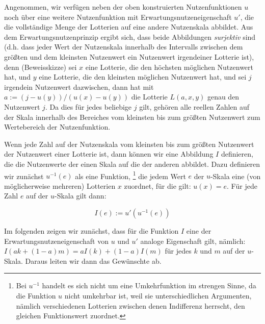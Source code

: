 Angenommen, wir verfügen neben der oben konstruierten Nutzenfunktionen $u$ noch
über eine weitere Nutzenfunktion mit Erwartungsnutzeneigenschaft $u'$, die die
vollständige Menge der Lotterien auf eine andere Nutzenskala abbildet. Aus dem
Erwartungsnutzenprinzip ergibt
sich, dass beide Abbildungen {\em surjektiv}
 sind (d.h. dass jeder Wert der
Nutzenskala innerhalb des Intervalls zwischen dem größten und dem kleinsten
Nutzenwert ein Nutzenwert irgendeiner Lotterie ist), denn (Beweisskizze) sei $x$
eine Lotterie, die den höchsten möglichen Nutzenwert hat, und $y$ eine Lotterie,
die den kleinsten möglichen Nutzenwert hat, und sei $j$ irgendein Nutzenwert
dazwischen, dann hat mit $a := (j-u(y))/(u(x)-u(y))$ die Lotterie $L(a, x, y)$
genau den Nutzenwert $j$. Da dies für jedes beliebige $j$ gilt, gehören alle
reellen Zahlen auf der Skala innerhalb des Bereiches vom kleinsten bis zum
größten Nutzenwert zum Wertebereich der Nutzenfunktion.

 Wenn jede Zahl auf der Nutzenskala vom kleinsten bis zum größten
Nutzenwert der Nutzenwert einer Lotterie ist, dann können wir eine Abbildung
 $I$ definieren, die die Nutzenwerte der einen Skala auf die der anderen
abbildet. Dazu definieren wir zunächst $u^{-1}(e)$ als eine Funktion,
\footnote{Bei $u^{-1}$ handelt es sich nicht um eine Umkehrfunktion im strengen
Sinne, da die Funktion $u$ nicht umkehrbar ist, weil sie unterschiedlichen
Argumenten, nämlich verschiedenen Lotterien zwischen denen Indifferenz
herrscht, den gleichen Funktionswert zuordnet.} die jedem Wert $e$ der $u$-Skala 
eine (von möglicherweise mehreren) Lotterien $x$ zuordnet, für die gilt:
$u(x)=e$. Für jede Zahl $e$ auf der $u$-Skala gilt dann:

\[ I(e) := u'(u^{-1}(e)) \]


Im folgenden zeigen wir zunächst, dass für die Funktion $I$ eine der
Erwartungsnutzeneigenschaft von $u$ und $u'$ analoge Eigenschaft gilt, nämlich:
$I(ak+(1-a)m) = aI(k) + (1-a)I(m)$ für jedes $k$ und $m$ auf der
$u$-Skala. Daraus leiten wir dann das Gewünschte ab.

